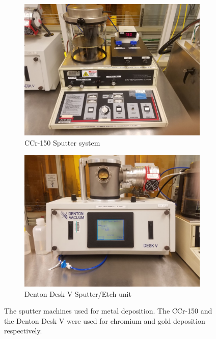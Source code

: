   \begin{figure}[h]
    \centering
    \begin{subfigure}[b]{0.45\textwidth}
        \centering
        \includegraphics[width=\textwidth]{images/CrC-150.jpg}
        \caption{CCr-150 Sputter system}
        \label{fig:ccr-150}
    \end{subfigure}
    \hfill
    \begin{subfigure}[b]{0.45\textwidth}
        \centering
        \includegraphics[width=\textwidth]{images/denton.jpg}
        \caption{Denton Desk V Sputter/Etch unit}
        \label{fig:denton}
    \end{subfigure} 
    \caption[Sputter machines used for metal deposition]{The sputter machines used for metal deposition. The CCr-150 and the Denton Desk V were used for chromium and gold deposition respectively.}
    \label{fig:sputterers}
 \end{figure}

